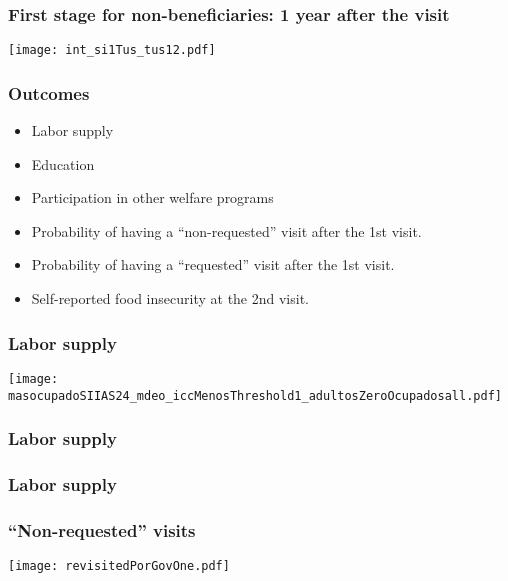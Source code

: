 \documentclass{beamer}
\begin{document}
\begin{frame}
\frametitle{First stage for non-beneficiaries: 1 year after the visit}
\begin{center}
\texttt{[image: int\_si1Tus\_tus12.pdf]}
\label{int_si1Tus_tus12.pdf}
\end{center}
\end{frame}

\begin{frame}
\frametitle{Outcomes}
\begin{itemize}
	\item Labor supply
	\item Education
	\item Participation in other welfare programs
	\item Probability of having a ``non-requested'' visit after the 1st visit.
	\item {\color{gray}Probability of having a ``requested'' visit after the 1st visit.}
	\item {\color{gray}Self-reported food insecurity at the 2nd visit.}
\end{itemize}
\end{frame}

\begin{frame}
\frametitle{Labor supply}
\begin{center}
	\texttt{[image: masocupadoSIIAS24\_mdeo\_iccMenosThreshold1\_adultosZeroOcupadosall.pdf]}
	\label{masocupadoSIIAS24_mdeo_iccMenosThreshold1_adultosZeroOcupadosall}
\end{center}
\end{frame}

\begin{frame}
\frametitle{Labor supply}
\begin{figure}
	
\end{figure}
\end{frame}

\begin{frame}
\frametitle{Labor supply}
\begin{figure}
	
\end{figure}
\end{frame}



\begin{frame}
\frametitle{``Non-requested'' visits}
\begin{center}
	\texttt{[image: revisitedPorGovOne.pdf]}
	\label{revisitedPorGovOne}
\end{center}
\end{frame}
\end{document}
